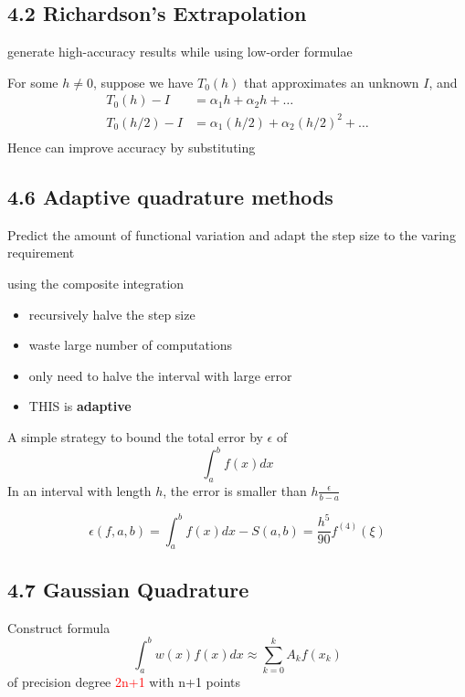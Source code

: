 \documentclass[11pt]{article}
\begin{document}
\subsection{4.2 Richardson's Extrapolation}
\label{sec:orgc722b7c}
generate high-accuracy results while using low-order formulae

For some \(h\neq 0\), suppose we have \(T_0(h)\) that approximates an unknown
\(I\), and
\begin{align*}
T_0(h)-I&=\alpha_1 h+\alpha_2h+\dots\\
T_0(h/2)-I&=\alpha_1(h/2)+\alpha_2(h/2)^2+\dots\\
\end{align*}
Hence can improve accuracy by substituting

\subsection{4.6 Adaptive quadrature methods}
\label{sec:org6e31d6c}
Predict the amount of functional variation and adapt the step size to the
varing requirement

using the composite integration
\begin{itemize}
\item recursively halve the step size
\item waste large number of computations
\item only need to halve the interval with large error
\item THIS is \textbf{adaptive}
\end{itemize}


A simple strategy to bound the total error by \(\epsilon\) of
\begin{equation*}
\int_a^bf(x)dx
\end{equation*}
In an interval with length \(h\), the error is smaller than
\(h\frac{\epsilon}{b-a}\)


\begin{equation*}
\epsilon(f,a,b)=\int_a^bf(x)dx-S(a,b)=\frac{h^5}{90}f^{(4)}(\xi)
\end{equation*}

\subsection{4.7 Gaussian Quadrature}
\label{sec:org3cfdcbd}
Construct formula 
\begin{equation*}
\int_a^bw(x)f(x)dx\approx \displaystyle\sum_{k=0}^kA_kf(x_k)
\end{equation*}
of precision degree \textcolor{red}{2n+1} with n+1 points
\end{document}
